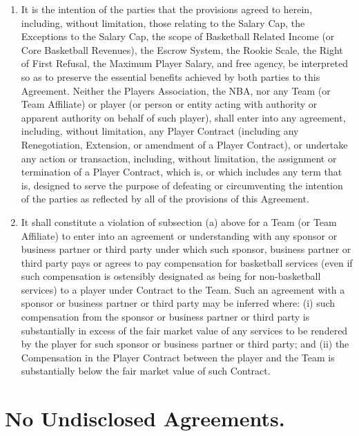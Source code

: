\documentclass[
]{book}
\providecommand{\tightlist}{%
  \setlength{\itemsep}{0pt}\setlength{\parskip}{0pt}}
\begin{document}
\begin{enumerate}
\def\labelenumi{(\alph{enumi})}
\tightlist
\item
  It is the intention of the parties that the provisions agreed to herein, including, without limitation, those relating to the Salary Cap, the Exceptions to the Salary Cap, the scope of Basketball Related Income (or Core Basketball Revenues), the Escrow System, the Rookie Scale, the Right of First Refusal, the Maximum Player Salary, and free agency, be interpreted so as to preserve the essential benefits achieved by both parties to this Agreement. Neither the Players Association, the NBA, nor any Team (or Team Affiliate) or player (or person or entity acting with authority or apparent authority on behalf of such player), shall enter into any agreement, including, without limitation, any Player Contract (including any Renegotiation, Extension, or amendment of a Player Contract), or undertake any action or transaction, including, without limitation, the assignment or termination of a Player Contract, which is, or which includes any term that is, designed to serve the purpose of defeating or circumventing the intention of the parties as reflected by all of the provisions of this Agreement.
\item
  It shall constitute a violation of subsection (a) above for a Team (or Team Affiliate) to enter into an agreement or understanding with any sponsor or business partner or third party under which such sponsor, business partner or third party pays or agrees to pay compensation for basketball services (even if such compensation is ostensibly designated as being for non-basketball services) to a player under Contract to the Team. Such an agreement with a sponsor or business partner or third party may be inferred where: (i) such compensation from the sponsor or business partner or third party is substantially in excess of the fair market value of any services to be rendered by the player for such sponsor or business partner or third party; and (ii) the Compensation in the Player Contract between the player and the Team is substantially below the fair market value of such Contract.
\end{enumerate}

\hypertarget{no-undisclosed-agreements.}{%
\section{\texorpdfstring{\textbf{No Undisclosed Agreements.}}{No Undisclosed Agreements.}}\label{no-undisclosed-agreements.}}
\end{document}
